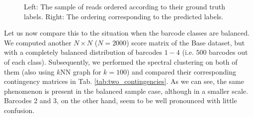 \begin{figure}[!ht]
    \centering
    \qquad
    \caption[Discovery matrices orderings]{Left: The sample of reads ordered according to their ground truth labels. Right: The ordering corresponding to the predicted labels.}%
    \label{fig:true_pred_comparison}
\end{figure}

Let us now compare this to the situation when the barcode classes are balanced. We computed another $N \times N$ ($N=2000$) score matrix of the Base dataset, but with a completely balanced distribution of barcodes $1-4$ (i.e. $500$ barcodes out of each class). Subsequently, we performed the spectral clustering on both of them (also using $k$NN graph for $k=100$) and compared their corresponding contingency matrices in Tab. \ref{tab:two_contingencies}. As we can see, the same phenomenon is present in the balanced sample case, although in a smaller scale. Barcodes $2$ and $3$, on the other hand, seem to be well pronounced with little confusion.
\bigskip

